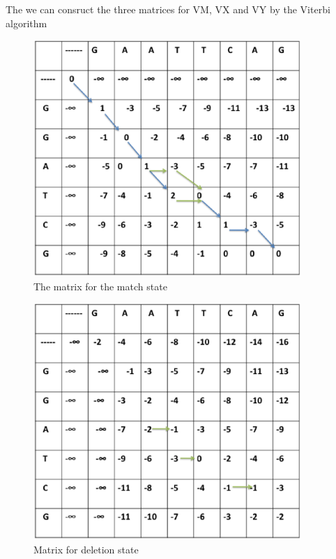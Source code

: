 \documentclass[english, a4paper,11pt]{article}
\begin{document}
The we can consruct the three matrices for VM, VX and VY by the Viterbi
algorithm

%
\begin{figure}
\begin{centering}
\includegraphics[width=4in]{Slide1}\caption{The matrix for the match state}

\par\end{centering}

%
\end{figure}


%
\begin{figure}
\begin{centering}
\includegraphics[width=4in]{Slide2}
\par\end{centering}

\caption{Matrix for deletion state}


%
\end{figure}
\end{document}
